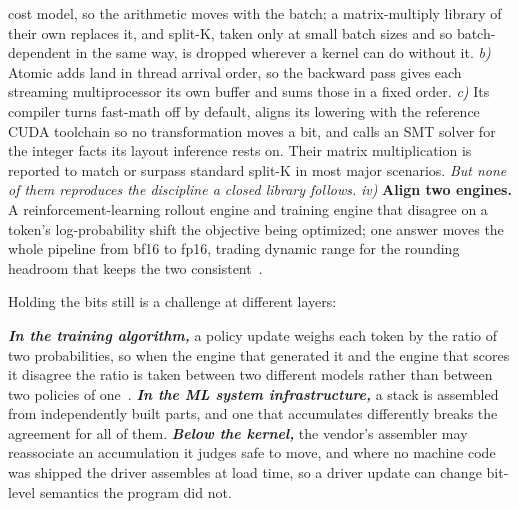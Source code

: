 \documentclass[sigplan,nonacm]{acmart}
\begin{document}
cost model, so the arithmetic moves with the batch; a matrix-multiply library of
their own replaces it, and split-K, taken only at small batch sizes and so
batch-dependent in the same way, is dropped wherever a kernel can do without it.
\emph{b)} Atomic adds land in thread arrival order, so the backward pass gives
each streaming multiprocessor its own buffer and sums those in a fixed order.
\emph{c)} Its compiler turns fast-math off by default, aligns its lowering with
the reference CUDA toolchain so no transformation moves a bit, and calls an SMT
solver for the integer facts its layout inference rests on.
Their matrix multiplication is reported to match or surpass standard split-K in
most major scenarios. \textit{But none of them reproduces the discipline a closed library follows.} 
\emph{iv)} \textbf{Align two engines.} A reinforcement-learning rollout engine
and training engine that disagree on a token's log-probability shift the
objective being optimized; one answer moves the whole pipeline from bf16 to
fp16, trading dynamic range for the rounding headroom that keeps the two
consistent~\cite{fp16mismatch}.


Holding the bits still is a challenge at different layers:


\textbf{\textit{In the training algorithm,}} a policy update weighs each token
by the ratio of two probabilities, so when the engine that generated it and the
engine that scores it disagree the ratio is taken between two different models
rather than between two policies of one~\cite{fp16mismatch}.
\textbf{\textit{In the ML system infrastructure,}} a stack is assembled from
independently built parts, and one that accumulates differently breaks the
agreement for all of them. \textbf{\textit{Below the kernel,}} the vendor's
assembler may reassociate an accumulation it judges safe to move, and where no
machine code was shipped the driver assembles at load time, so a driver update
can change bit-level semantics the program did not.
\end{document}

